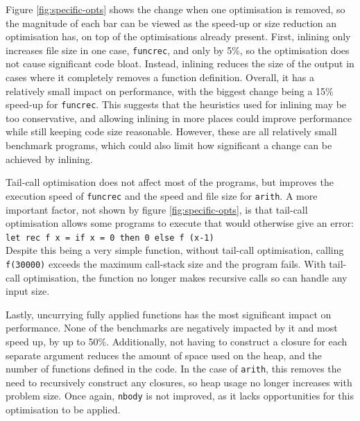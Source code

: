 Figure \ref{fig:specific-opts} shows the change when one optimisation is removed, so the magnitude of each bar can be viewed as the speed-up or size reduction an optimisation has, on top of the optimisations already present. First, inlining only increases file size in one case, \verb|funcrec|, and only by 5\%, so the optimisation does not cause significant code bloat. Instead, inlining reduces the size of the output in cases where it completely removes a function definition. Overall, it has a relatively small impact on performance, with the biggest change being a 15\% speed-up for \verb|funcrec|. This suggests that the heuristics used for inlining may be too conservative, and allowing inlining in more places could improve performance while still keeping code size reasonable. However, these are all relatively small benchmark programs, which could also limit how significant a change can be achieved by inlining. %

Tail-call optimisation does not affect most of the programs, but improves the execution speed of \verb|funcrec| and the speed and file size for \verb|arith|. A more important factor, not shown by figure \ref{fig:specific-opts}, is that tail-call optimisation allows some programs to execute that would otherwise give an error: \\
\verb|let rec f x = if x = 0 then 0 else f (x-1)| \\
Despite this being a very simple function, without tail-call optimisation, calling \verb|f(30000)| exceeds the maximum call-stack size and the program fails. With tail-call optimisation, the function no longer makes recursive calls so can handle any input size.

Lastly, uncurrying fully applied functions has the most significant impact on performance. None of the benchmarks are negatively impacted by it and most speed up, by up to 50\%. Additionally, not having to construct a closure for each separate argument reduces the amount of space used on the heap, and the number of functions defined in the code. In the case of \verb|arith|, this removes the need to recursively construct any closures, so heap usage no longer increases with problem size. Once again, \verb|nbody| is not improved, as it lacks opportunities for this optimisation to be applied.

